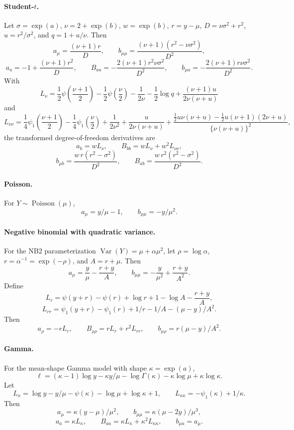 \paragraph{Student-\(t\).}
Let \(\sigma=\exp(a)\), \(\nu=2+\exp(b)\), \(w=\exp(b)\),
\(r=y-\mu\), \(D=\nu\sigma^2+r^2\), \(u=r^2/\sigma^2\), and
\(q=1+u/\nu\).  Then
\[
    a_\mu=\frac{(\nu+1)r}{D},\qquad
    b_{\mu\mu}=\frac{(\nu+1)(r^2-\nu\sigma^2)}{D^2},
\]
\[
    a_a=-1+\frac{(\nu+1)r^2}{D},\qquad
    B_{aa}=-\frac{2(\nu+1)r^2\nu\sigma^2}{D^2},\qquad
    b_{\mu a}=-\frac{2(\nu+1)r\nu\sigma^2}{D^2}.
\]
With
\[
    L_\nu=
    \frac12\psi\!\left(\frac{\nu+1}{2}\right)
    -\frac12\psi\!\left(\frac{\nu}{2}\right)
    -\frac{1}{2\nu}
    -\frac12\log q
    +\frac{(\nu+1)u}{2\nu(\nu+u)}
\]
and
\[
    L_{\nu\nu}=
    \frac14\psi_1\!\left(\frac{\nu+1}{2}\right)
    -\frac14\psi_1\!\left(\frac{\nu}{2}\right)
    +\frac{1}{2\nu^2}
    +\frac{u}{2\nu(\nu+u)}
    +\frac{\frac12u\nu(\nu+u)-\frac12u(\nu+1)(2\nu+u)}
           {\{\nu(\nu+u)\}^2},
\]
the transformed degree-of-freedom derivatives are
\[
    a_b=wL_\nu,\qquad B_{bb}=wL_\nu+w^2L_{\nu\nu},
\]
\[
    b_{\mu b}=\frac{w\,r(r^2-\sigma^2)}{D^2},\qquad
    B_{ab}=\frac{w\,r^2(r^2-\sigma^2)}{D^2}.
\]

\paragraph{Poisson.}
For \(Y\sim\operatorname{Poisson}(\mu)\),
\[
    a_\mu=y/\mu-1,\qquad b_{\mu\mu}=-y/\mu^2.
\]

\paragraph{Negative binomial with quadratic variance.}
For the NB2 parameterization \(\operatorname{Var}(Y)=\mu+\alpha\mu^2\), let
\(\rho=\log\alpha\), \(r=\alpha^{-1}=\exp(-\rho)\), and \(A=r+\mu\).  Then
\[
    a_\mu=\frac{y}{\mu}-\frac{r+y}{A},\qquad
    b_{\mu\mu}=-\frac{y}{\mu^2}+\frac{r+y}{A^2}.
\]
Define
\[
    L_r=\psi(y+r)-\psi(r)+\log r+1-\log A-\frac{r+y}{A},
\]
\[
    L_{rr}=
    \psi_1(y+r)-\psi_1(r)+1/r-1/A-(\mu-y)/A^2.
\]
Then
\[
    a_\rho=-rL_r,\qquad
    B_{\rho\rho}=rL_r+r^2L_{rr},\qquad
    b_{\mu\rho}=r(\mu-y)/A^2.
\]

\paragraph{Gamma.}
For the mean-shape Gamma model with shape \(\kappa=\exp(a)\),
\[
    \ell=(\kappa-1)\log y-\kappa y/\mu-\log\Gamma(\kappa)
    -\kappa\log\mu+\kappa\log\kappa .
\]
Let
\[
    L_\kappa=\log y-y/\mu-\psi(\kappa)-\log\mu+\log\kappa+1,
    \qquad
    L_{\kappa\kappa}=-\psi_1(\kappa)+1/\kappa .
\]
Then
\[
    a_\mu=\kappa(y-\mu)/\mu^2,\qquad
    b_{\mu\mu}=\kappa(\mu-2y)/\mu^3,
\]
\[
    a_a=\kappa L_\kappa,\qquad
    B_{aa}=\kappa L_\kappa+\kappa^2L_{\kappa\kappa},\qquad
    b_{\mu a}=a_\mu.
\]

